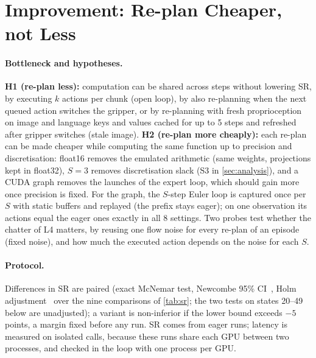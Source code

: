 \section{Improvement: Re-plan Cheaper, not Less}
\label{sec:improve}

\paragraph{Bottleneck and hypotheses.}
\textbf{H1 (re-plan less):} computation can be shared across steps without lowering SR, by executing $k$ actions per chunk (open loop), by also re-planning when the next queued action switches the gripper, or by re-planning with fresh proprioception on image and language keys and values cached for up to 5 steps and refreshed after gripper switches (stale image).
\textbf{H2 (re-plan more cheaply):} each re-plan can be made cheaper while computing the same function up to precision and discretisation: float16 removes the emulated arithmetic (same weights, projections kept in float32), $S{=}3$ removes discretisation slack (S3 in \cref{sec:analysis}), and a CUDA graph removes the launches of the expert loop, which should gain more once precision is fixed.
For the graph, the $S$-step Euler loop is captured once per $S$ with static buffers and replayed (the prefix stays eager); on one observation its actions equal the eager ones exactly in all 8 settings.
Two probes test whether the chatter of L4 matters, by reusing one flow noise for every re-plan of an episode (fixed noise), and how much the executed action depends on the noise for each $S$.

\paragraph{Protocol.}
Differences in SR are paired (exact McNemar test, Newcombe 95\% CI~\cite{newcombe1998improved}, Holm adjustment~\cite{holm1979simple} over the nine comparisons of \cref{tab:sr}; the two tests on states 20--49 below are unadjusted); a variant is non-inferior if the lower bound exceeds $-5$ points, a margin fixed before any run.
SR comes from eager runs; latency is measured on isolated calls, because these runs share each GPU between two processes, and checked in the loop with one process per GPU.

